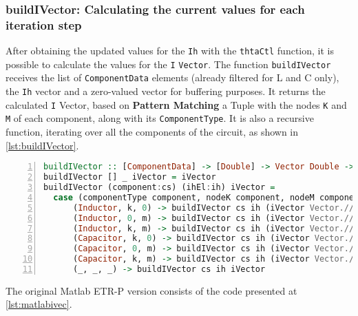 \subsubsection{ buildIVector: Calculating the current values for each iteration step }

After obtaining the updated values for the \lstinline!Ih! with the \lstinline!thtaCtl! function, it is possible to calculate the values for the \lstinline!I! \lstinline!Vector!. The function \lstinline!buildIVector! receives the list of \lstinline!ComponentData! elements (already filtered for L and C only), the \lstinline!Ih! vector and a zero-valued vector for buffering purposes. It returns the calculated \lstinline!I! Vector, based on \textbf{Pattern Matching} a Tuple with the nodes \lstinline!K! and \lstinline!M! of each component, along with its \lstinline!ComponentType!. It is also a recursive function, iterating over all the components of the circuit, as shown in \cref{lst:buildIVector}.

\begin{lstlisting}[language=Haskell, numbers=left, caption={Building I Vector: buildIVector}, captionpos=b, label={lst:buildIVector}]
buildIVector :: [ComponentData] -> [Double] -> Vector Double -> Vector Double
buildIVector [] _ iVector = iVector
buildIVector (component:cs) (ihEl:ih) iVector =
  case (componentType component, nodeK component, nodeM component) of 
      (Inductor, k, 0) -> buildIVector cs ih (iVector Vector.// [((k - 1), ((iVector Vector.! (k-1)) + ihEl))])
      (Inductor, 0, m) -> buildIVector cs ih (iVector Vector.// [((m - 1), ((iVector Vector.! (m-1)) - ihEl))])
      (Inductor, k, m) -> buildIVector cs ih (iVector Vector.// [((m - 1), ((iVector Vector.! (m-1)) - ihEl)), ((k-1), ((iVector Vector.! (k-1)) + ihEl))])
      (Capacitor, k, 0) -> buildIVector cs ih (iVector Vector.// [((k - 1), ((iVector Vector.! (k-1)) + ihEl))])
      (Capacitor, 0, m) -> buildIVector cs ih (iVector Vector.// [((m - 1), ((iVector Vector.! (m-1)) - ihEl))])
      (Capacitor, k, m) -> buildIVector cs ih (iVector Vector.// [((m - 1), ((iVector Vector.! (m-1)) - ihEl)), ((k-1), ((iVector Vector.! (k-1)) + ihEl))])
      (_, _, _) -> buildIVector cs ih iVector
\end{lstlisting}


The original Matlab ETR-P version consists of the code presented at \cref{lst:matlabivec}.

